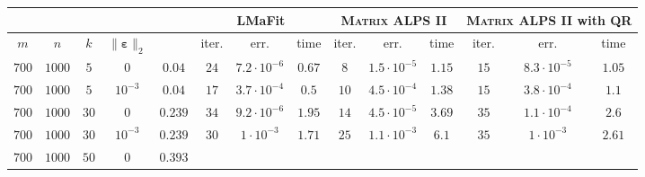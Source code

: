 \documentclass[twocolumn]{svjour3}
\newcommand{\vectornormbig}[1]{\big\|#1\big\|}
\newcommand{\noise}{\boldsymbol{\varepsilon}}
\newcommand{\rank}{k}
\begin{document}
\begin{table*} [!htp]
\begin{center}
\begin{tabular}{|c|c|c|c|c|c|c|c|c|c|c|c|c|c}
\multicolumn{4}{c|}{} & & \multicolumn{3}{|c|}{LMaFit} & \multicolumn{3}{|c}{\textsc{Matrix ALPS II}} & \multicolumn{3}{|c}{\textsc{Matrix ALPS II} with QR}  \\
\hline \hline
\multicolumn{1}{c}{$m$}  & \multicolumn{1}{c}{$n$} & \multicolumn{1}{c}{$\rank$} & \multicolumn{1}{c|}{$\vectornormbig{\noise}_2$} & & 
\multicolumn{1}{|c}{\rm{iter.}} & \multicolumn{1}{c}{\rm{err.}} & \multicolumn{1}{c|}{\rm{time}} & 
\multicolumn{1}{|c}{\rm{iter.}} & \multicolumn{1}{c}{\rm{err.}} & \multicolumn{1}{c|}{\rm{time}} &
\multicolumn{1}{|c}{\rm{iter.}} & \multicolumn{1}{c}{\rm{err.}} & \multicolumn{1}{c}{\rm{time}}  \\
\hline
\multicolumn{1}{c}{$700$} & \multicolumn{1}{c}{$1000$} & \multicolumn{1}{c}{$5$}  & \multicolumn{1}{c|}{$0$} & $ 0.04 $ & 
\multicolumn{1}{|c}{$24$} & \multicolumn{1}{c}{$7.2 \cdot 10^{-6}$} & \multicolumn{1}{c|}{$0.67$} &
\multicolumn{1}{|c}{$8$} & \multicolumn{1}{c}{$1.5 \cdot 10^{-5}$} & \multicolumn{1}{c}{$1.15$} &
\multicolumn{1}{|c}{$15$} & \multicolumn{1}{c}{$8.3 \cdot 10^{-5}$} & \multicolumn{1}{c}{$1.05$} \\
\hline
\multicolumn{1}{c}{$700$} & \multicolumn{1}{c}{$1000$} & \multicolumn{1}{c}{$5$}  & \multicolumn{1}{c|}{$10^{-3}$} & $ 0.04 $ & 
\multicolumn{1}{|c}{$17$} & \multicolumn{1}{c}{$3.7 \cdot 10^{-4}$} & \multicolumn{1}{c|}{$0.5$} &
\multicolumn{1}{|c}{$10$} & \multicolumn{1}{c}{$4.5 \cdot 10^{-4}$} & \multicolumn{1}{c}{$1.38$} &
\multicolumn{1}{|c}{$15$} & \multicolumn{1}{c}{$3.8 \cdot 10^{-4}$} & \multicolumn{1}{c}{$1.1$} \\
\hline
\multicolumn{1}{c}{$700$} & \multicolumn{1}{c}{$1000$} & \multicolumn{1}{c}{$30$}  & \multicolumn{1}{c|}{$0$} & $ 0.239 $ & 
\multicolumn{1}{|c}{$34$} & \multicolumn{1}{c}{$9.2 \cdot 10^{-6}$} & \multicolumn{1}{c|}{$\mathbf{1.95}$} &
\multicolumn{1}{|c}{$14$} & \multicolumn{1}{c}{$4.5 \cdot 10^{-5}$} & \multicolumn{1}{c}{$3.69$} &
\multicolumn{1}{|c}{$35$} & \multicolumn{1}{c}{$1.1 \cdot 10^{-4}$} & \multicolumn{1}{c}{$2.6$} \\
\hline
\multicolumn{1}{c}{$700$} & \multicolumn{1}{c}{$1000$} & \multicolumn{1}{c}{$30$}  & \multicolumn{1}{c|}{$10^{-3}$} & $ 0.239 $ & 
\multicolumn{1}{|c}{$30$} & \multicolumn{1}{c}{$1 \cdot 10^{-3}$} & \multicolumn{1}{c|}{$\mathbf{1.71}$} &
\multicolumn{1}{|c}{$25$} & \multicolumn{1}{c}{$1.1 \cdot 10^{-3}$} & \multicolumn{1}{c}{$6.1$} &
\multicolumn{1}{|c}{$35$} & \multicolumn{1}{c}{$1 \cdot 10^{-3}$} & \multicolumn{1}{c}{$2.61$} \\
\hline
\multicolumn{1}{c}{$700$} & \multicolumn{1}{c}{$1000$} & \multicolumn{1}{c}{$50$}  & \multicolumn{1}{c|}{$0$} & $ 0.393 $ & 

\end{tabular}
\end{center}
\end{table*}
\end{document}
